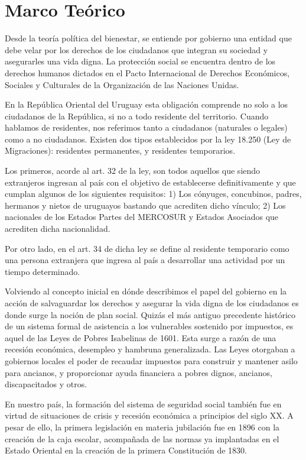 \documentclass{article}
\begin{document}
\section{Marco Teórico}

Desde la teoría política del bienestar, se entiende por gobierno una entidad que debe velar por los derechos de los ciudadanos que integran su sociedad y asegurarles una vida digna. La protección social se encuentra dentro de los derechos humanos dictados en el Pacto Internacional de Derechos Económicos, Sociales y Culturales de la Organización de las Naciones Unidas.	

En la República Oriental del Uruguay esta obligación comprende no solo a los ciudadanos de la República, si no a todo residente del territorio. Cuando hablamos de residentes, nos referimos tanto a ciudadanos (naturales o legales) como a no ciudadanos. Existen dos tipos establecidos por la ley 18.250 (Ley de Migraciones): residentes permanentes, y residentes temporarios.

Los primeros, acorde al art. 32 de la ley, son todos aquellos que siendo extranjeros ingresan al país con el objetivo de establecerse definitivamente y que cumplan algunos de los siguientes requisitos: 1) Los cónyuges, concubinos, padres, hermanos y nietos de uruguayos bastando que acrediten dicho vínculo; 2) Los nacionales de los Estados Partes del MERCOSUR y Estados Asociados que acrediten dicha nacionalidad.

Por otro lado, en el art. 34 de dicha ley se define al residente temporario como una persona extranjera que ingresa al país a desarrollar una actividad por un tiempo determinado.

Volviendo al concepto inicial en dónde describimos el papel del gobierno en la acción de salvaguardar los derechos y asegurar la vida digna de los ciudadanos es donde surge la noción de plan social. Quizás el más antiguo precedente histórico de un sistema formal de asistencia a los vulnerables sostenido por impuestos, es aquel de las Leyes de Pobres Isabelinas de 1601. Esta surge a razón de una recesión económica, desempleo y hambruna generalizada. Las Leyes otorgaban a gobiernos locales el poder de recaudar impuestos para construir y mantener asilo para ancianos, y proporcionar ayuda financiera a pobres dignos, ancianos, discapacitados y otros.

En nuestro país, la formación del sistema de  seguridad social también fue en virtud de situaciones de crisis y recesión económica a principios del siglo XX. A pesar de ello, la primera legislación en materia jubilación fue en 1896 con la creación de la caja escolar, acompañada de las normas ya implantadas en el Estado Oriental en la creación de la primera Constitución  de 1830.
\end{document}
